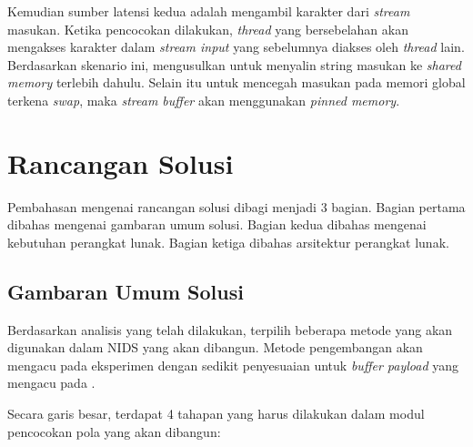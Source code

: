       
      Kemudian sumber latensi kedua adalah mengambil karakter dari \emph{stream} masukan. Ketika pencocokan dilakukan, \emph{thread} yang bersebelahan akan mengakses karakter dalam \emph{stream input} yang sebelumnya diakses oleh \emph{thread} lain. Berdasarkan skenario ini, \cite{lin2013} mengusulkan untuk menyalin string masukan ke \emph{shared memory} terlebih dahulu. Selain itu untuk mencegah masukan pada memori global terkena \emph{swap}, maka \emph{stream buffer} akan menggunakan \emph{pinned memory}. 

  \section{Rancangan Solusi}

    Pembahasan mengenai rancangan solusi dibagi menjadi 3 bagian. Bagian pertama dibahas mengenai gambaran umum solusi. Bagian kedua dibahas mengenai kebutuhan perangkat lunak. Bagian ketiga dibahas arsitektur perangkat lunak. 

    \subsection{Gambaran Umum Solusi}

      Berdasarkan  analisis  yang  telah  dilakukan, terpilih beberapa metode yang akan digunakan dalam NIDS yang akan dibangun. Metode pengembangan akan mengacu pada eksperimen \cite{lin2013} dengan sedikit penyesuaian untuk \emph{buffer payload} yang mengacu pada \cite{gnort2008}.
      

      Secara garis besar, terdapat 4 tahapan yang harus dilakukan dalam modul pencocokan pola yang akan dibangun:

